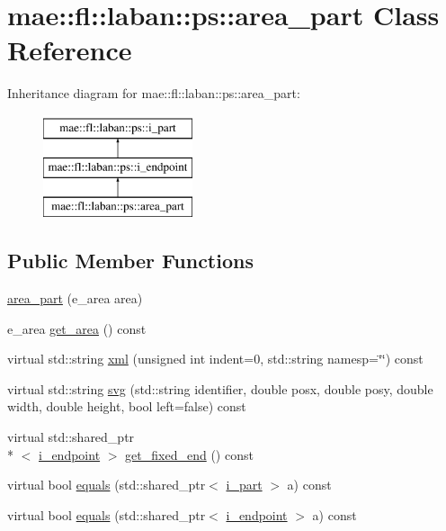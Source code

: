 \hypertarget{classmae_1_1fl_1_1laban_1_1ps_1_1area__part}{\section{mae\-:\-:fl\-:\-:laban\-:\-:ps\-:\-:area\-\_\-part Class Reference}
\label{classmae_1_1fl_1_1laban_1_1ps_1_1area__part}
}
Inheritance diagram for mae\-:\-:fl\-:\-:laban\-:\-:ps\-:\-:area\-\_\-part\-:\begin{figure}[H]
\begin{center}
\leavevmode
\includegraphics[height=3.000000cm]{classmae_1_1fl_1_1laban_1_1ps_1_1area__part}
\end{center}
\end{figure}
\subsection*{Public Member Functions}
\begin{DoxyCompactItemize}
\item 
\hyperlink{classmae_1_1fl_1_1laban_1_1ps_1_1area__part_a8bbf19849b499277fb4fce4547971ec0}{area\-\_\-part} (e\-\_\-area area)
\item 
e\-\_\-area \hyperlink{classmae_1_1fl_1_1laban_1_1ps_1_1area__part_a084e6beba901f615c5043b569389745d}{get\-\_\-area} () const 
\item 
virtual std\-::string \hyperlink{classmae_1_1fl_1_1laban_1_1ps_1_1area__part_a3ffd61d8cba76a5312a737a40dccb4ec}{xml} (unsigned int indent=0, std\-::string namesp=\char`\"{}\char`\"{}) const 
\item 
virtual std\-::string \hyperlink{classmae_1_1fl_1_1laban_1_1ps_1_1area__part_ad28ba26a5e96db2f23f07f974633fdf7}{svg} (std\-::string identifier, double posx, double posy, double width, double height, bool left=false) const 
\item 
virtual std\-::shared\-\_\-ptr\\*
$<$ \hyperlink{classmae_1_1fl_1_1laban_1_1ps_1_1i__endpoint}{i\-\_\-endpoint} $>$ \hyperlink{classmae_1_1fl_1_1laban_1_1ps_1_1area__part_ad3697cd7f8840ff9341da918cd7f84f5}{get\-\_\-fixed\-\_\-end} () const 
\item 
virtual bool \hyperlink{classmae_1_1fl_1_1laban_1_1ps_1_1area__part_aa223417cb9c21426014d0099f9fad72b}{equals} (std\-::shared\-\_\-ptr$<$ \hyperlink{classmae_1_1fl_1_1laban_1_1ps_1_1i__part}{i\-\_\-part} $>$ a) const 
\item 
virtual bool \hyperlink{classmae_1_1fl_1_1laban_1_1ps_1_1area__part_af1715756d2b703af8ea2d7549ff7a6fc}{equals} (std\-::shared\-\_\-ptr$<$ \hyperlink{classmae_1_1fl_1_1laban_1_1ps_1_1i__endpoint}{i\-\_\-endpoint} $>$ a) const 
\end{DoxyCompactItemize}


